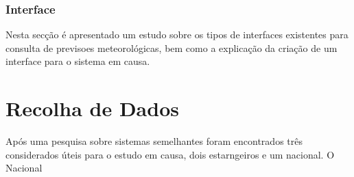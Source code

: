 \documentclass[11pt,a4paper,a4wide,headsepline,bibtotoc,twoside]{scrbook}
\begin{document}
\subsection*{Interface}
Nesta secção é apresentado um estudo sobre os tipos de interfaces existentes para consulta de previsoes meteorológicas, bem como a explicação da criação de um interface para o sistema em causa.

\cleardoublepage
\chapter{Recolha de Dados}
\label{chap:recolha_dados}
Após uma pesquisa sobre sistemas semelhantes foram encontrados três considerados úteis para o estudo em causa, dois estarngeiros e um nacional. O Nacional

\cleardoublepage

\end{document}
